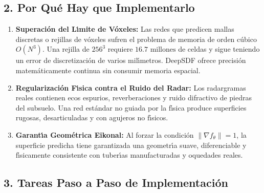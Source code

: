 \documentclass[11pt,a4paper]{article}
\begin{document}
\subsection{2. Por Qu{\'e} Hay que Implementarlo}
\begin{enumerate}
    \item \textbf{Superaci{\'o}n del L{\'\i}mite de V{\'o}xeles:} Las redes que predicen mallas discretas o rejillas de v{\'o}xeles sufren el problema de memoria de orden c{\'u}bico $O(N^3)$. Una rejilla de $256^3$ requiere $16.7\text{ millones}$ de celdas y sigue teniendo un error de discretizaci{\'o}n de varios mil{\'\i}metros. DeepSDF ofrece precisi{\'o}n matem{\'a}ticamente continua sin consumir memoria espacial.
    \item \textbf{Regularizaci{\'o}n F{\'\i}sica contra el Ruido del Radar:} Los radargramas reales contienen ecos espurios, reverberaciones y ruido difractivo de piedras del subsuelo. Una red est{\'a}ndar no guiada por la f{\'\i}sica produce superficies rugosas, desarticuladas y con agujeros no f{\'\i}sicos.
    \item \textbf{Garant{\'\i}a Geom{\'e}trica Eikonal:} Al forzar la condici{\'o}n $\|\nabla f_\theta\| = 1$, la superficie predicha tiene garantizada una geometr{\'\i}a suave, diferenciable y f{\'\i}sicamente consistente con tuber{\'\i}as manufacturadas y oquedades reales.
\end{enumerate}

\subsection{3. Tareas Paso a Paso de Implementaci{\'o}n}
\end{document}
